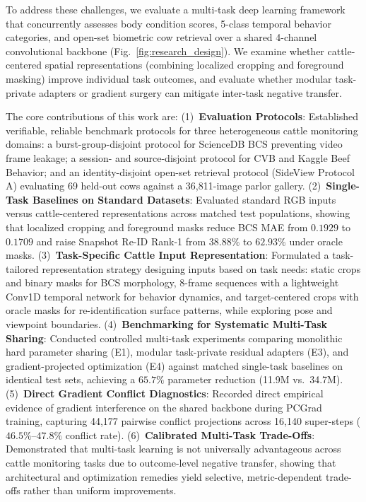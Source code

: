 \documentclass[conference]{IEEEtran}
\begin{document}
To address these challenges, we evaluate a multi-task deep learning framework that concurrently assesses body condition scores, 5-class temporal behavior categories, and open-set biometric cow retrieval over a shared 4-channel convolutional backbone (Fig.~\ref{fig:research_design}). We examine whether cattle-centered spatial representations (combining localized cropping and foreground masking) improve individual task outcomes, and evaluate whether modular task-private adapters or gradient surgery can mitigate inter-task negative transfer.

The core contributions of this work are: (1)~\textbf{Evaluation Protocols}: Established verifiable, reliable benchmark protocols for three heterogeneous cattle monitoring domains: a burst-group-disjoint protocol for ScienceDB BCS preventing video frame leakage; a session- and source-disjoint protocol for CVB and Kaggle Beef Behavior; and an identity-disjoint open-set retrieval protocol (SideView Protocol A) evaluating 69 held-out cows against a 36,811-image parlor gallery. (2)~\textbf{Single-Task Baselines on Standard Datasets}: Evaluated standard RGB inputs versus cattle-centered representations across matched test populations, showing that localized cropping and foreground masks reduce BCS MAE from $0.1929$ to $0.1709$ and raise Snapshot Re-ID Rank-1 from $38.88\%$ to $62.93\%$ under oracle masks. (3)~\textbf{Task-Specific Cattle Input Representation}: Formulated a task-tailored representation strategy designing inputs based on task needs: static crops and binary masks for BCS morphology, 8-frame sequences with a lightweight Conv1D temporal network for behavior dynamics, and target-centered crops with oracle masks for re-identification surface patterns, while exploring pose and viewpoint boundaries. (4)~\textbf{Benchmarking for Systematic Multi-Task Sharing}: Conducted controlled multi-task experiments comparing monolithic hard parameter sharing (E1), modular task-private residual adapters (E3), and gradient-projected optimization (E4) against matched single-task baselines on identical test sets, achieving a $65.7\%$ parameter reduction (11.9M vs.\ 34.7M). (5)~\textbf{Direct Gradient Conflict Diagnostics}: Recorded direct empirical evidence of gradient interference on the shared backbone during PCGrad training, capturing 44,177 pairwise conflict projections across 16,140 super-steps ($46.5\%$--$47.8\%$ conflict rate). (6)~\textbf{Calibrated Multi-Task Trade-Offs}: Demonstrated that multi-task learning is not universally advantageous across cattle monitoring tasks due to outcome-level negative transfer, showing that architectural and optimization remedies yield selective, metric-dependent trade-offs rather than uniform improvements.
\end{document}
